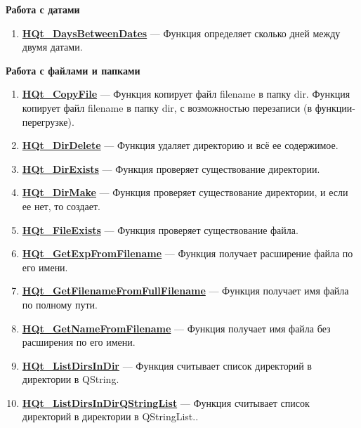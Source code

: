 \documentclass[a4paper,12pt]{article}
\begin{document}
\textbf{Работа с датами}
\begin{enumerate}

\item \textbf{\hyperref[HQt_DaysBetweenDates]{HQt\_DaysBetweenDates}} --- Функция определяет сколько дней между двумя датами.

\end{enumerate}

\textbf{Работа с файлами и папками}
\begin{enumerate}

\item \textbf{\hyperref[HQt_CopyFile]{HQt\_CopyFile}} --- Функция копирует файл filename в папку dir. Функция копирует файл filename в папку dir, с возможностью перезаписи (в функции-перегрузке).

\item \textbf{\hyperref[HQt_DirDelete]{HQt\_DirDelete}} --- Функция удаляет директорию и всё ее содержимое.

\item \textbf{\hyperref[HQt_DirExists]{HQt\_DirExists}} --- Функция проверяет существование директории.

\item \textbf{\hyperref[HQt_DirMake]{HQt\_DirMake}} --- Функция проверяет существование директории, и если ее нет, то создает.

\item \textbf{\hyperref[HQt_FileExists]{HQt\_FileExists}} --- Функция проверяет существование файла.

\item \textbf{\hyperref[HQt_GetExpFromFilename]{HQt\_GetExpFromFilename}} --- Функция получает расширение файла по его имени.

\item \textbf{\hyperref[HQt_GetFilenameFromFullFilename]{HQt\_GetFilenameFromFullFilename}} --- Функция получает имя файла по полному пути.

\item \textbf{\hyperref[HQt_GetNameFromFilename]{HQt\_GetNameFromFilename}} --- Функция получает имя файла без расширения по его имени.

\item \textbf{\hyperref[HQt_ListDirsInDir]{HQt\_ListDirsInDir}} --- Функция считывает список директорий в директории в QString.

\item \textbf{\hyperref[HQt_ListDirsInDirQStringList]{HQt\_ListDirsInDirQStringList}} --- Функция считывает список директорий в директории в QStringList..


\end{enumerate}
\end{document}

